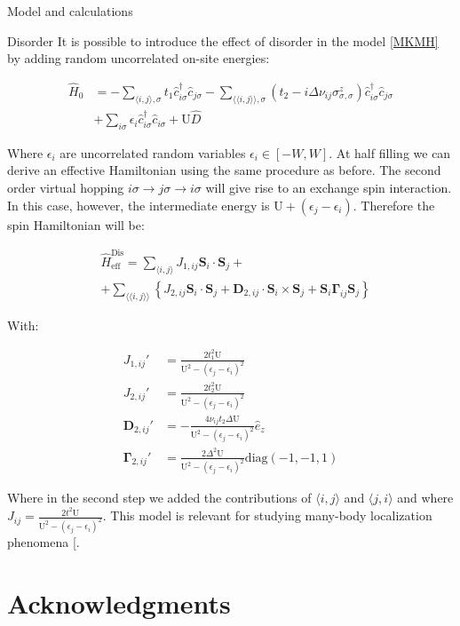 \documentclass[aps,prl,twocolumn,amsmath,amssymb,superscriptaddress,nobibnotes]{revtex4}%
\renewcommand{\cite}[1]{{[}\onlinecite{#1}{]}}
\newcommand{\n}{\nonumber}
\newcommand{\bs}{\boldsymbol}
\begin{document}
\begin{section}{Model and calculations}
\begin{subsection}{Disorder}
It is possible to introduce the effect of disorder in the model \ref{MKMH} by adding random uncorrelated on-site energies:

\begin{align}
\label{DisorderedHubbardModel}
\hat{H}_0 &= - \sum_{\langle i,j \rangle, \sigma} t_1\hat{c}_{i \sigma}^\dagger \hat{c}_{j \sigma} -\sum_{\langle \langle i,j \rangle \rangle, \sigma}(t_2 - i\Delta\nu_{ij}\sigma^z_{\sigma, \sigma})\hat{c}_{i \sigma}^\dagger \hat{c}_{j \sigma} \n \\
	& + \sum_{i \sigma} \epsilon_i \hat{c}_{i \sigma}^\dagger \hat{c}_{i \sigma} +
	\text{U}\hat{D}
\end{align}

Where $\epsilon_i$ are uncorrelated random variables $\epsilon_i \in [-W,W]$. At half filling we can derive an effective Hamiltonian using the same procedure as before. The second order virtual hopping $i\sigma \rightarrow j\sigma \rightarrow i\sigma$ will give rise to an exchange spin interaction. In this case, however, the intermediate energy is $\text{U} + (\epsilon_j - \epsilon_i)$. Therefore the spin Hamiltonian will be:

\begin{align}
&\hat{H}_{\text{eff}}^{\text{Dis}} = \sum_{\langle i,j \rangle} J_{1,ij}\bs{S}_i\cdot\bs{S}_j +\n \\
&+ \sum_{\langle \langle i,j \rangle \rangle} \left\{ J_{2,ij}\bs{S}_i\cdot\bs{S}_j + \bs{D}_{2,ij}\cdot \bs{S}_i \times \bs{S}_j + \bs{S}_i \bs{\Gamma}_{ij} \bs{S}_j \right\}
\end{align}

With:

\begin{align*}
J_{1,ij}' &= \frac{2t_1^2\text{U}}{\text{U}^2-(\epsilon_j-\epsilon_i)^2} \\
J_{2,ij}' &= \frac{2t_2^2\text{U}}{\text{U}^2-(\epsilon_j-\epsilon_i)^2} \\
\bs{D}_{2,ij}' &= -\frac{4\nu_{ij} t_2 \Delta \text{U}}{\text{U}^2-(\epsilon_j-\epsilon_i)^2}\hat{e}_z \\
\bs{\Gamma}_{2,ij}' &= \frac{2\Delta^2\text{U}}{\text{U}^2-(\epsilon_j-\epsilon_i)^2}\text{diag}(-1,-1,1)
\end{align*}

Where in the second step we added the contributions of $\langle i,j \rangle$ and $\langle j,i \rangle$ and where $J_{ij} = \frac{2t^2\text{U}}{\text{U}^2-(\epsilon_j-\epsilon_i)^2}$. This model is relevant for studying many-body localization phenomena \cite{Protopopov2018}.
\end{subsection}

\end{section}

\section*{Acknowledgments}


\end{document}
